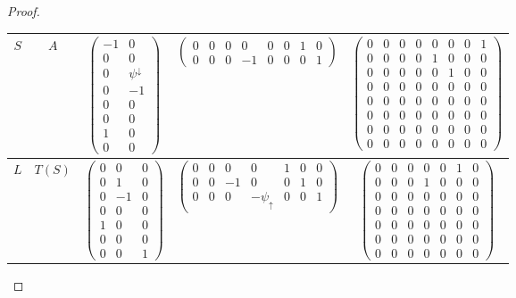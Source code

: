 \documentclass[11pt]{amsart}
\theoremstyle{definition}
\theoremstyle{remark}
\numberwithin{equation}{section}
\begin{document}
\begin{proof}
\begin{table}
\begin{tabular}{c|c|c|c|c}
	$S$ & $A$  &  $\left(\begin{array}{cc} -1 & 0 \\ 0 & 0 \\ 0 & \psi^{\downarrow} \\ 0 & -1 \\ 0 & 0 \\ 0 & 0 \\ 1 & 0 \\ 0 & 0\end{array}\right)$ &  $\left(\begin{array}{cccccccc} 0 & 0 & 0 & 0 & 0 & 0 & 1 & 0 \\ 0 & 0 & 0 & -1 & 0 & 0 & 0 & 1\end{array}\right)$ & $\left( \begin{array}{cccccccc} 0 & 0 & 0 & 0 & 0 & 0 & 0 & 1 \\ 0 & 0 & 0 & 0 & 1 & 0 & 0 & 0 \\ 0 & 0 & 0 & 0 & 0 & 1 & 0 & 0 \\ 0 & 0 & 0 & 0 & 0 & 0 & 0 & 0 \\ 0 & 0 & 0 & 0 & 0 & 0 & 0 & 0 \\ 0 & 0 & 0 & 0 & 0 & 0 & 0 & 0 \\ 0 & 0 & 0 & 0 & 0 & 0 & 0 & 0 \\ 0 & 0 & 0 & 0 & 0 & 0 & 0 & 0 \end{array}\right)$ \\ \hline
	$L$ & $T(S)$ & $\left(\begin{array}{ccc} 0 & 0 & 0 \\ 0 & 1 & 0 \\ 0 & -1 & 0 \\ 0 & 0 & 0 \\ 1 & 0 & 0 \\ 0 & 0 & 0 \\ 0 & 0 & 1\end{array}\right)$  & $\left(\begin{array}{ccccccc} 0 & 0 & 0 & 0 & 1 & 0 & 0 \\ 0 & 0 & -1 & 0 & 0 & 1 & 0 \\ 0 & 0 & 0 & -\psi_{\uparrow} & 0 & 0 & 1\end{array}\right)$ & $\left(\begin{array}{ccccccc} 0 & 0 & 0 & 0 & 0 & 1 & 0 \\ 0 & 0 & 0 & 1 & 0 & 0 & 0 \\ 0 & 0 & 0 & 0 & 0 & 0 & 0  \\ 0 & 0 & 0 & 0 & 0 & 0 & 0 \\ 0 & 0 & 0 & 0 & 0 & 0 & 0 \\ 0 & 0 & 0 & 0 & 0 & 0 & 0 \\ 0 & 0 & 0 & 0 & 0 & 0 & 0 \end{array}\right)$

\end{tabular}
\end{table}
\end{proof}
\end{document}
